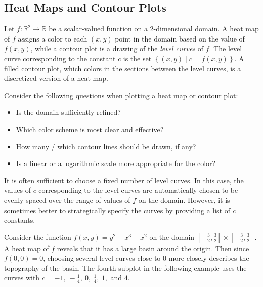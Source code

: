 \subsection*{Heat Maps and Contour Plots} %

Let $f:\mathbb{R}^2\rightarrow\mathbb{R}$ be a scalar-valued function on a 2-dimensional domain.
A heat map of $f$ assigns a color to each $(x,y)$ point in the domain based on the value of $f(x,y)$, while a contour plot is a drawing of the \emph{level curves} of $f$.
The level curve corresponding to the constant $c$ is the set $\left\{(x,y)\mid c = f(x,y)\right\}$.
A filled contour plot, which colors in the sections between the level curves, is a discretized version of a heat map.

Consider the following questions when plotting a heat map or contour plot:
%
\begin{itemize}
    \item Is the domain sufficiently refined?
    \item Which color scheme is most clear and effective?
    \item How many / which contour lines should be drawn, if any?
    \item Is a linear or a logarithmic scale more appropriate for the color?
\end{itemize}

It is often sufficient to choose a fixed number of level curves.
In this case, the values of $c$ corresponding to the level curves are automatically chosen to be evenly spaced over the range of values of $f$ on the domain.
However, it is sometimes better to strategically specify the curves by providing a list of $c$ constants.

Consider the function $f(x,y) = y^2 - x^3 + x^2$ on the domain $[-\frac{3}{2}, \frac{3}{2}] \times [-\frac{3}{2}, \frac{3}{2}]$.
A heat map of $f$ reveals that it has a large basin around the origin.
Then since $f(0,0) = 0$, choosing several level curves close to $0$ more closely describes the topography of the basin.
The fourth subplot in the following example uses the curves with $c = -1,\ -\frac{1}{4},\ 0,\ \frac{1}{4},\ 1,$ and $4$.

